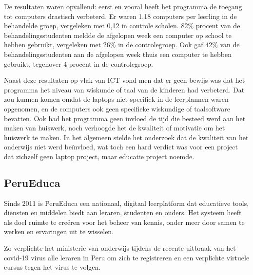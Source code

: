 De resultaten waren opvallend: eerst en vooral heeft het programma de toegang tot computers drastisch verbeterd. Er waren 1,18 computers per leerling in de behandelde groep, vergeleken met 0,12 in controle scholen. 82\% procent van de behandelingsstudenten meldde de afgelopen week een computer op school te hebben gebruikt, vergeleken met 26\% in de controlegroep. Ook gaf 42\% van de behandelingsstudenten aan de afgelopen week thuis een computer te hebben gebruikt, tegenover 4 procent in de controlegroep. \autocite{Ibarraran2012}

Naast deze resultaten op vlak van ICT vond men dat er geen bewijs was dat het programma het niveau van wiskunde of taal van de kinderen had verbeterd. Dat zou kunnen komen omdat de laptops niet specifiek in de leerplannen waren opgenomen, en de computers ook geen specifieke wiskundige of taalsoftware bevatten. Ook had het programma geen invloed de tijd die besteed werd aan het maken van huiswerk, noch verhoogde het de kwaliteit of motivatie om het huiswerk te maken. In het algemeen stelde het onderzoek dat de kwaliteit van het onderwijs niet werd beïnvloed, wat toch een hard verdict was voor een project dat zichzelf geen laptop project, maar educatie project noemde. \autocite{Ibarraran2012}

\subsection{PeruEduca}
Sinds 2011 is PeruEduca een nationaal, digitaal leerplatform dat educatieve tools, diensten en middelen biedt aan leraren, studenten en ouders. Het systeem heeft als doel ruimte te creëren voor het beheer van kennis, onder meer door samen te werken en ervaringen uit te wisselen. \autocite{EducationPeru2020}

Zo verplichte het ministerie van onderwijs tijdens de recente uitbraak van het covid-19 virus alle leraren in Peru om zich te registreren en een verplichte virtuele cursus tegen het virus te volgen. \autocite{Educacion2020}




